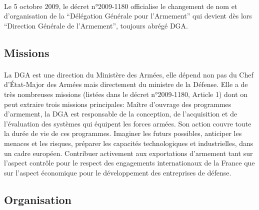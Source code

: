 \documentclass[11pt, book, english, french, standardlists]{upmethodology-document}
\begin{document}
				\paragraph*{}
					Le 5 octobre 2009, le décret n°2009-1180\cite{DEFD0918712D} officialise le changement de nom et d'organisation de la ``Délégation Générale pour l'Armement'' qui devient dès lors ``Direction Générale de l'Armement'', toujours abrégé \gls{DGA}.
			\subsection{Missions}
				\paragraph*{}
					La \gls{DGA} est une direction du Ministère des Armées, elle dépend non pas du Chef d’État-Major des Armées mais directement du ministre de la Défense. Elle a de très nombreuses missions (listées dans le décret n°2009-1180\cite{DEFD0918712D}, Article 1) dont on peut extraire trois missions principales:
					Maître d'ouvrage des programmes d'armement, la \gls{DGA} est responsable de la conception, de l'acquisition et de l'évaluation des systèmes qui équipent les forces armées. Son action couvre toute la durée de vie de ces programmes.
					Imaginer les futurs possibles, anticiper les menaces et les risques, préparer les capacités technologiques et industrielles, dans un cadre européen.
					Contribuer activement aux exportations d'armement tant sur l'aspect contrôle pour le respect des engagements internationaux de la France que sur l'aspect économique pour le développement des entreprises de défense.
			\subsection{Organisation}
\end{document}
